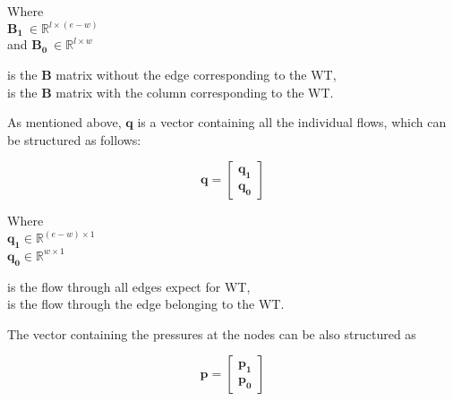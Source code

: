 \begin{minipage}[t]{0.18\textwidth}
Where\\
\hspace*{8mm} $\pmb{B_1} \: \in \mathbb{R}^{l \times (e-w)}$  \\
and \hspace*{0.4mm} $\pmb{B_0} \: \in \mathbb{R}^{l \times w} $ 
\end{minipage}
\begin{minipage}[t]{0.70\textwidth}
\vspace*{2mm}
\hspace*{4mm} is the $\pmb{B}$ matrix without the edge corresponding to the WT,\\
\hspace*{4mm} is the $\pmb{B}$ matrix with the column corresponding to the WT.
\end{minipage}

As mentioned above, $\pmb{q}$ is a vector containing all the individual flows, which can be structured as follows:

\begin{equation}
\pmb{q} =
\begin{bmatrix}
         \pmb{q_1} \\
	\pmb{q_0} 
\end{bmatrix}
\label{qmatrix}
\end{equation}

\begin{minipage}[t]{0.20\textwidth}
Where\\
\hspace*{8mm} $\pmb{q_1} \in \mathbb{R}^{(e-w) \times 1}$  \\
\hspace*{8mm} $\pmb{q_0} \in \mathbb{R}^{w \times 1} $ 
\end{minipage}
\begin{minipage}[t]{0.68\textwidth}
\vspace*{2mm}
\hspace*{4mm} is the flow through all edges expect for WT,\\
\hspace*{4mm} is the flow through the edge belonging to the WT. 
\end{minipage}

The vector containing the pressures at the nodes can be also structured as

\begin{equation}
\pmb{p} =
\begin{bmatrix}
         \pmb{p_1} \\
	\pmb{p_0} 
\end{bmatrix}
\end{equation}


